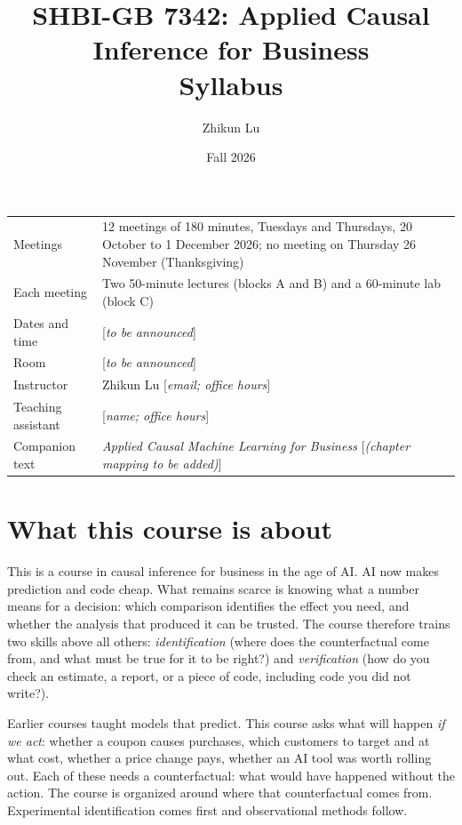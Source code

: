 \documentclass[11pt]{article}
\title{\textbf{SHBI-GB 7342: Applied Causal Inference for Business}\\[0.3em]
\large Syllabus}
\author{Zhikun Lu}
\date{Fall 2026}
\newcommand{\tbd}[1]{\textcolor{warnred}{[\emph{#1}]}}
\begin{document}
\maketitle
\vspace{-1.5em}

\begin{center}
\small
\begin{tabular}{lL{11.6cm}}
\toprule
Meetings & 12 meetings of 180 minutes, Tuesdays and Thursdays, 20 October to 1 December 2026; no meeting on Thursday 26 November (Thanksgiving) \\
Each meeting & Two 50-minute lectures (blocks A and B) and a 60-minute lab (block C) \\
Dates and time & \tbd{to be announced} \\
Room & \tbd{to be announced} \\
Instructor & Zhikun Lu \quad \tbd{email; office hours} \\
Teaching assistant & \tbd{name; office hours} \\
Companion text & \emph{Applied Causal Machine Learning for Business} \tbd{(chapter mapping to be added)} \\
\bottomrule
\end{tabular}
\end{center}

\section*{What this course is about}

This is a course in causal inference for business in the age of AI. AI now makes prediction and
code cheap. What remains scarce is knowing what a number means for a decision: which comparison
identifies the effect you need, and whether the analysis that produced it can be trusted. The
course therefore trains two skills above all others: \emph{identification} (where does the
counterfactual come from, and what must be true for it to be right?) and \emph{verification} (how
do you check an estimate, a report, or a piece of code, including code you did not write?).

Earlier courses taught models that predict. This course asks what will happen \emph{if we act}:
whether a coupon causes purchases, which customers to target and at what cost, whether a price
change pays, whether an AI tool was worth rolling out. Each of these needs a counterfactual: what
would have happened without the action. The course is organized around where that counterfactual
comes from. Experimental identification comes first and observational methods follow.
\end{document}
